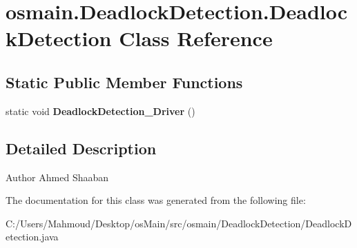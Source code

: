 \hypertarget{classosmain_1_1_deadlock_detection_1_1_deadlock_detection}{}\section{osmain.\+Deadlock\+Detection.\+Deadlock\+Detection Class Reference}
\label{classosmain_1_1_deadlock_detection_1_1_deadlock_detection}
\subsection*{Static Public Member Functions}
\begin{DoxyCompactItemize}
\item 
static void {\bfseries Deadlock\+Detection\+\_\+\+Driver} ()\hypertarget{classosmain_1_1_deadlock_detection_1_1_deadlock_detection_a00df6579a2b41682691f38d431d713da}{}\label{classosmain_1_1_deadlock_detection_1_1_deadlock_detection_a00df6579a2b41682691f38d431d713da}

\end{DoxyCompactItemize}


\subsection{Detailed Description}
\begin{DoxyAuthor}{Author}
Ahmed Shaaban 
\end{DoxyAuthor}


The documentation for this class was generated from the following file\+:\begin{DoxyCompactItemize}
\item 
C\+:/\+Users/\+Mahmoud/\+Desktop/os\+Main/src/osmain/\+Deadlock\+Detection/Deadlock\+Detection.\+java\end{DoxyCompactItemize}
